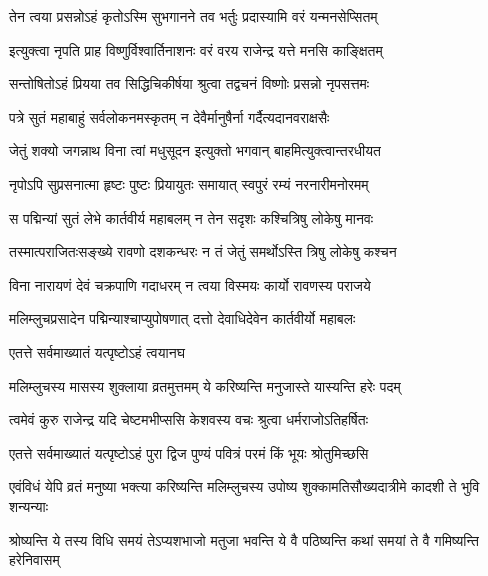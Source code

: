 \twolineshloka
{तेन त्वया प्रसन्नोऽहं कृतोऽस्मि सुभगानने}
{तव भर्तुः प्रदास्यामि वरं यन्मनसेप्सितम्} %

\twolineshloka
{इत्युक्त्वा नृपति प्राह विष्णुर्विश्वार्तिनाशनः}
{वरं वरय राजेन्द्र यत्ते मनसि काङ्क्षितम्} %

\twolineshloka
{सन्तोषितोऽहं प्रियया तव सिद्धिचिकीर्षया}
{श्रुत्वा तद्वचनं विष्णोः प्रसन्नो नृपसत्तमः} %

\twolineshloka
{पत्रे सुतं महाबाहुं सर्वलोकनमस्कृतम्}
{न देवैर्मानुषैर्ना गर्दैत्यदानवराक्षसैः} %

\twolineshloka
{जेतुं शक्यो जगन्नाथ विना त्वां मधुसूदन}
{इत्युक्तो भगवान् बाहमित्युक्त्वान्तरधीयत} %

\twolineshloka
{नृपोऽपि सुप्रसनात्मा हृष्टः पुष्टः प्रियायुतः}
{समायात् स्वपुरं रम्यं नरनारीमनोरमम्} %

\twolineshloka
{स पद्मिन्यां सुतं लेभे कार्तवीर्य महाबलम्}
{न तेन सदृशः कश्चित्रिषु लोकेषु मानवः} %

\twolineshloka
{तस्मात्पराजितःसङ्ख्ये रावणो दशकन्धरः}
{न तं जेतुं समर्थोऽस्ति त्रिषु लोकेषु कश्चन} %

\twolineshloka
{विना नारायणं देवं चक्रपाणि गदाधरम्}
{न त्वया विस्मयः कार्यो रावणस्य पराजये} %

\twolineshloka
{मलिम्लुचप्रसादेन पद्मिन्याश्चाप्युपोषणात्}
{दत्तो देवाधिदेवेन कार्तवीर्यो महाबलः} %



\onelineshloka
{एतत्ते सर्वमाख्यातं यत्पृष्टोऽहं त्वयानघ} %

\twolineshloka
{मलिम्लुचस्य मासस्य शुक्लाया व्रतमुत्तमम्}
{ये करिष्यन्ति मनुजास्ते यास्यन्ति हरेः पदम्} %

\twolineshloka
{त्वमेवं कुरु राजेन्द्र यदि चेष्टमभीप्ससि}
{केशवस्य वचः श्रुत्वा धर्मराजोऽतिहर्षितः} %



\twolineshloka
{एतत्ते सर्वमाख्यातं यत्पृष्टोऽहं पुरा द्विज}
{पुण्यं पवित्रं परमं किं भूयः श्रोतुमिच्छसि} %

\twolineshloka
{एवंविधं येपि व्रतं मनुष्या भक्त्या करिष्यन्ति मलिम्लुचस्य}
{उपोष्य शुक्कामतिसौख्यदात्रीमे कादशी ते भुवि शन्यन्याः} %

\twolineshloka
{श्रोष्यन्ति ये तस्य विधि समयं तेऽप्यशभाजो मतुजा भवन्ति}
{ये वै पठिष्यन्ति कथां समयां ते वै गमिष्यन्ति हरेनिवासम्} %


